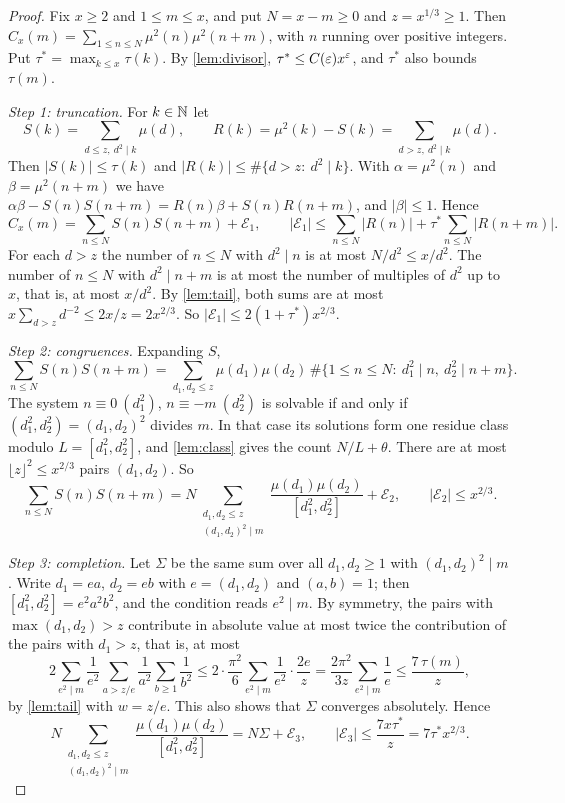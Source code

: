 \begin{proof}
Fix $x\ge2$ and $1\le m\le x$, and put $N=x-m\ge0$ and $z=x^{1/3}\ge1$. Then $C_x(m)=\sum_{1\le n\le N}\mu^2(n)\mu^2(n+m)$, with $n$ running over positive integers. Put $\tau^*=\max_{k\le x}\tau(k)$. By \cref{lem:divisor}, $\tau^*\le C(\varepsilon)x^\varepsilon$, and $\tau^*$ also bounds $\tau(m)$.

\emph{Step 1: truncation.} For $k\in\mathbb{N}$ let
\[
S(k)=\sum_{d\le z,\ d^2\mid k}\mu(d),\qquad R(k)=\mu^2(k)-S(k)=\sum_{d>z,\ d^2\mid k}\mu(d).
\]
Then $|S(k)|\le\tau(k)$ and $|R(k)|\le\#\{d>z:\ d^2\mid k\}$. With $\alpha=\mu^2(n)$ and $\beta=\mu^2(n+m)$ we have $\alpha\beta-S(n)S(n+m)=R(n)\beta+S(n)R(n+m)$, and $|\beta|\le1$. Hence
\[
C_x(m)=\sum_{n\le N}S(n)S(n+m)+\mathcal E_1,\qquad|\mathcal E_1|\le\sum_{n\le N}|R(n)|+\tau^*\sum_{n\le N}|R(n+m)|.
\]
For each $d>z$ the number of $n\le N$ with $d^2\mid n$ is at most $N/d^2\le x/d^2$. The number of $n\le N$ with $d^2\mid n+m$ is at most the number of multiples of $d^2$ up to $x$, that is, at most $x/d^2$. By \cref{lem:tail}, both sums are at most $x\sum_{d>z}d^{-2}\le2x/z=2x^{2/3}$. So $|\mathcal E_1|\le2(1+\tau^*)x^{2/3}$.

\emph{Step 2: congruences.} Expanding $S$,
\[
\sum_{n\le N}S(n)S(n+m)=\sum_{d_1,d_2\le z}\mu(d_1)\mu(d_2)\,\#\{1\le n\le N:\ d_1^2\mid n,\ d_2^2\mid n+m\}.
\]
The system $n\equiv0\ (d_1^2)$, $n\equiv-m\ (d_2^2)$ is solvable if and only if $(d_1^2,d_2^2)=(d_1,d_2)^2$ divides $m$. In that case its solutions form one residue class modulo $L=[d_1^2,d_2^2]$, and \cref{lem:class} gives the count $N/L+\theta$. There are at most $\lfloor z\rfloor^2\le x^{2/3}$ pairs $(d_1,d_2)$. So
\[
\sum_{n\le N}S(n)S(n+m)=N\sum_{\substack{d_1,d_2\le z\\(d_1,d_2)^2\mid m}}\frac{\mu(d_1)\mu(d_2)}{[d_1^2,d_2^2]}+\mathcal E_2,\qquad|\mathcal E_2|\le x^{2/3}.
\]

\emph{Step 3: completion.} Let $\Sigma$ be the same sum over all $d_1,d_2\ge1$ with $(d_1,d_2)^2\mid m$. Write $d_1=ea$, $d_2=eb$ with $e=(d_1,d_2)$ and $(a,b)=1$; then $[d_1^2,d_2^2]=e^2a^2b^2$, and the condition reads $e^2\mid m$. By symmetry, the pairs with $\max(d_1,d_2)>z$ contribute in absolute value at most twice the contribution of the pairs with $d_1>z$, that is, at most
\[
2\sum_{e^2\mid m}\frac1{e^2}\sum_{a>z/e}\frac1{a^2}\sum_{b\ge1}\frac1{b^2}\le2\cdot\frac{\pi^2}6\sum_{e^2\mid m}\frac1{e^2}\cdot\frac{2e}{z}=\frac{2\pi^2}{3z}\sum_{e^2\mid m}\frac1e\le\frac{7\,\tau(m)}{z},
\]
by \cref{lem:tail} with $w=z/e$. This also shows that $\Sigma$ converges absolutely. Hence
\[
N\sum_{\substack{d_1,d_2\le z\\(d_1,d_2)^2\mid m}}\frac{\mu(d_1)\mu(d_2)}{[d_1^2,d_2^2]}=N\Sigma+\mathcal E_3,\qquad|\mathcal E_3|\le\frac{7x\tau^*}{z}=7\tau^*x^{2/3}.
\]


\end{proof}
